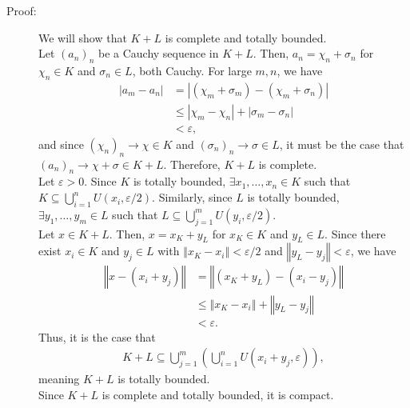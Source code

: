 \documentclass[10pt]{extarticle}
\newcommand{\norm}[1]{\left\Vert #1\right\Vert}
\begin{document}
  \begin{description}
    \item[Proof:] We will show that $K+L$ is complete and totally bounded.\\

      Let $(a_n)_n$ be a Cauchy sequence in $K+L$. Then, $a_n = \chi_n + \sigma_n$  for $\chi_n\in K$ and $\sigma_n\in L$, both Cauchy. For large $m,n$, we have
      \begin{align*}
        |a_m - a_n| &= |(\chi_m + \sigma_m) - (\chi_m + \sigma_n)|\\
                    &\leq |\chi_m - \chi_n| + |\sigma_m - \sigma_n|\\
                    &< \varepsilon,
      \end{align*}
      and since $(\chi_n)_n \rightarrow \chi\in K$ and $(\sigma_n)_n\rightarrow \sigma \in L$, it must be the case that $(a_n)_n \rightarrow \chi + \sigma \in K+L$. Therefore, $K+L$ is complete.\\

      Let $\varepsilon > 0$. Since $K$ is totally bounded, $\exists x_1,\dots,x_n\in K$ such that $K\subseteq \bigcup_{i=1}^{n} U(x_i,\varepsilon/2)$. Similarly, since $L$ is totally bounded, $\exists y_1,\dots,y_m\in L$ such that $L\subseteq \bigcup_{j=1}^{m}U(y_i,\varepsilon/2)$.\\

      Let $x\in K+L$. Then, $x = x_K + y_L$ for $x_K\in K$ and $y_L\in L$. Since there exist $x_i\in K$ and $y_j\in L$ with $\norm{x_K-x_i} < \varepsilon/2$ and $\norm{y_L-y_j}< \varepsilon$, we have
      \begin{align*}
        \norm{x - (x_i + y_j)} &= \norm{(x_K + y_L) - (x_i - y_j)}\\
                               &\leq \norm{x_K - x_i} + \norm{y_L - y_j}\\
                               &< \varepsilon.
      \end{align*}
      Thus, it is the case that
      \begin{align*}
        K+L \subseteq \bigcup_{j=1}^{m}\left(\bigcup_{i=1}^{n}U(x_i + y_j,\varepsilon)\right),
      \end{align*}
      meaning $K+L$ is totally bounded.\\

      Since $K+L$ is complete and totally bounded, it is compact.
  \end{description}
\end{document}
